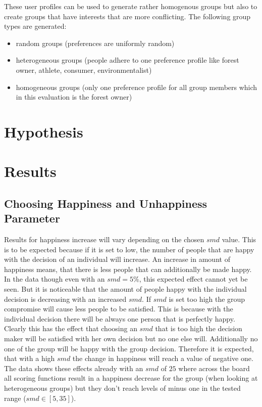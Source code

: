 These user profiles can be used to generate rather homogenous groups but also to create groups that have interests that are more conflicting. The following group types are generated:

\begin{itemize}
    \item random groups (preferences are uniformly random)
    \item heterogeneous groups (people adhere to one preference profile like forest owner, athlete, consumer, environmentalist)
    \item homogeneous groups (only one preference profile for all group members which in this evaluation is the forest owner)
\end{itemize}


\section{Hypothesis}
\label{sec:Evaluation:Scenario}

\section{Results}
\label{sec:Evaluation:Results}

\subsection{Choosing Happiness and Unhappiness Parameter}

Results for happiness increase will vary depending on the chosen $smd$ value. This is to be expected because if it is set to low, the number of people that are happy with the decision of an individual will increase. An increase in amount of happiness means, that there is less people that can additionally be made happy. In the data though even with an $smd = 5\%$, this expected effect cannot yet be seen. But it is noticeable that the amount of people happy with the individual decision is decreasing with an increased $smd$. If $smd$ is set too high the group compromise will cause less people to be satisfied. This is because with the individual decision there will be always one person that is perfectly happy. Clearly this has the effect that choosing an $smd$ that is too high the decision maker will be satisfied with her own decision but no one else will. Additionally no one of the group will be happy with the group decision. Therefore it is expected, that with a high $smd$ the change in happiness will reach a value of negative one. The data shows these effects already with an $smd$ of $25$ where across the board all scoring functions result in a happiness decrease for the group (when looking at heterogeneous groups) but they don't reach levels of minus one in the tested range ($smd \in [5,35]$).

